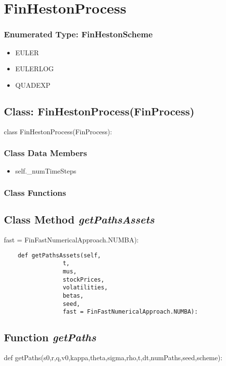 \documentclass[twoside,11pt]{book}
\begin{document}
\newpage
\section{FinHestonProcess}

\subsubsection{Enumerated Type: FinHestonScheme}
\begin{itemize}
\item{EULER}
\item{EULERLOG}
\item{QUADEXP}
\end{itemize}

\subsection{Class: FinHestonProcess(FinProcess)}
class FinHestonProcess(FinProcess):

\subsubsection{Class Data Members}
\begin{itemize}
\item{self.\_numTimeSteps}
\end{itemize}

\subsubsection{Class Functions}

\subsection{Class Method {\it getPathsAssets}}
fast = FinFastNumericalApproach.NUMBA):

\begin{lstlisting}
    def getPathsAssets(self, 
                 t,
                 mus,
                 stockPrices,
                 volatilities,
                 betas,
                 seed, 
                 fast = FinFastNumericalApproach.NUMBA):
\end{lstlisting}

\subsection{Function {\it getPaths}}
def getPaths(s0,r,q,v0,kappa,theta,sigma,rho,t,dt,numPaths,seed,scheme):
\end{document}
